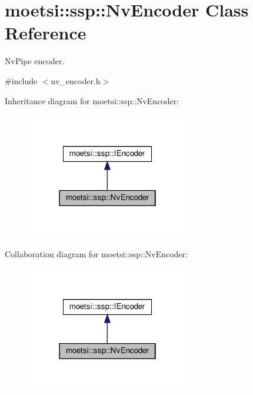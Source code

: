 \hypertarget{classmoetsi_1_1ssp_1_1NvEncoder}{}\section{moetsi\+:\+:ssp\+:\+:Nv\+Encoder Class Reference}
\label{classmoetsi_1_1ssp_1_1NvEncoder}


Nv\+Pipe encoder.  




{\ttfamily \#include $<$nv\+\_\+encoder.\+h$>$}



Inheritance diagram for moetsi\+:\+:ssp\+:\+:Nv\+Encoder\+:\nopagebreak
\begin{figure}[H]
\begin{center}
\leavevmode
\includegraphics[width=202pt]{classmoetsi_1_1ssp_1_1NvEncoder__inherit__graph}
\end{center}
\end{figure}


Collaboration diagram for moetsi\+:\+:ssp\+:\+:Nv\+Encoder\+:\nopagebreak
\begin{figure}[H]
\begin{center}
\leavevmode
\includegraphics[width=202pt]{classmoetsi_1_1ssp_1_1NvEncoder__coll__graph}
\end{center}
\end{figure}
